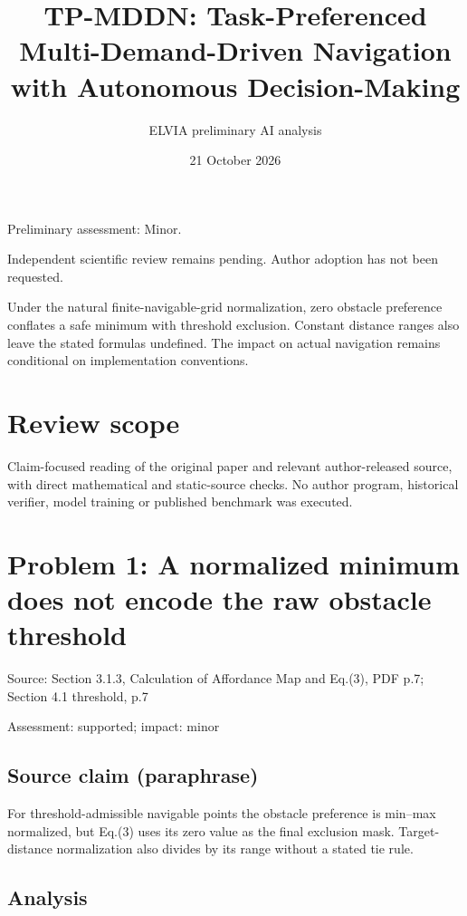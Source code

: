 \documentclass[11pt]{article}
\begin{document}
\title{TP-MDDN: Task-Preferenced Multi-Demand-Driven Navigation with Autonomous Decision-Making}

\author{ELVIA preliminary AI analysis}\date{21 October 2026}\maketitle

Preliminary assessment: Minor.\par

Independent scientific review remains pending. Author adoption has not been requested.

Under the natural finite-navigable-grid normalization, zero obstacle preference conflates a safe minimum with threshold exclusion. Constant distance ranges also leave the stated formulas undefined. The impact on actual navigation remains conditional on implementation conventions.

\section*{Review scope}

Claim-focused reading of the original paper and relevant author-released source, with direct mathematical and static-source checks. No author program, historical verifier, model training or published benchmark was executed.

\section*{Problem 1: A normalized minimum does not encode the raw obstacle threshold}

Source: Section 3.1.3, Calculation of Affordance Map and Eq.(3), PDF p.7; Section 4.1 threshold, p.7

Assessment: supported; impact: minor

\subsection*{Source claim (paraphrase)}

For threshold-admissible navigable points the obstacle preference is min–max normalized, but Eq.(3) uses its zero value as the final exclusion mask. Target-distance normalization also divides by its range without a stated tie rule.

\subsection*{Analysis}
\end{document}
